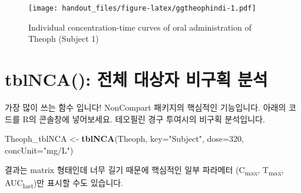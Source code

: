 \documentclass[12pt,]{krantz}
\newenvironment{Shaded}{\begin{snugshade}}{\end{snugshade}}
\newcommand{\KeywordTok}[1]{\textcolor[rgb]{0.13,0.29,0.53}{\textbf{#1}}}
\newcommand{\DataTypeTok}[1]{\textcolor[rgb]{0.13,0.29,0.53}{#1}}
\newcommand{\DecValTok}[1]{\textcolor[rgb]{0.00,0.00,0.81}{#1}}
\newcommand{\StringTok}[1]{\textcolor[rgb]{0.31,0.60,0.02}{#1}}
\newcommand{\OperatorTok}[1]{\textcolor[rgb]{0.81,0.36,0.00}{\textbf{#1}}}
\newcommand{\NormalTok}[1]{#1}
\begin{document}
\begin{Shaded}
\end{Shaded}

\begin{figure}
\centering
\texttt{[image: handout\_files/figure-latex/ggtheophindi-1.pdf]}
\caption{\label{fig:ggtheophindi}Individual concentration-time curves of
oral administration of Theoph (Subject 1)}
\end{figure}

\hypertarget{tblnca----}{%
\section{tblNCA(): 전체 대상자 비구획 분석}\label{tblnca----}}

가장 많이 쓰는 함수 입니다! NonCompart 패키지의 핵심적인 기능입니다.
아래의 코드를 R의 콘솔창에 넣어보세요. 테오필린 경구 투여시의 비구획
분석입니다.

\begin{Shaded}
\begin{Highlighting}[]
\NormalTok{Theoph_tblNCA <-}\StringTok{ }\KeywordTok{tblNCA}\NormalTok{(Theoph, }\DataTypeTok{key=}\StringTok{"Subject"}\NormalTok{, }\DataTypeTok{dose=}\DecValTok{320}\NormalTok{, }\DataTypeTok{concUnit=}\StringTok{"mg/L"}\NormalTok{)}
\end{Highlighting}
\end{Shaded}

결과는 matrix 형태인데 너무 길기 때문에 핵심적인 일부 파라메터
(C\textsubscript{max}, T\textsubscript{max}, AUC\textsubscript{last})만
표시할 수도 있습니다.
\end{document}
